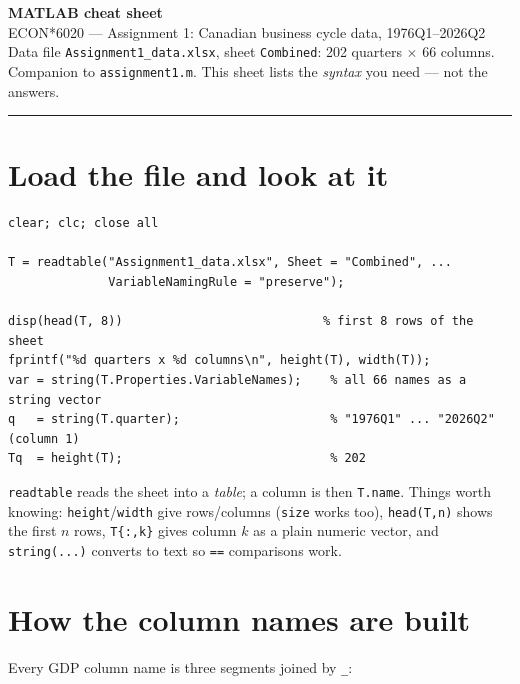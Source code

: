 \documentclass[11pt]{article}
\begin{document}
\begin{center}
{\LARGE\bfseries MATLAB cheat sheet}\\[2pt]
{\large ECON*6020 --- Assignment 1: Canadian business cycle data, 1976Q1--2026Q2}\\[4pt]
{\small Data file \texttt{Assignment1\_data.xlsx}, sheet \texttt{Combined}: 202 quarters $\times$ 66 columns.\\
Companion to \texttt{assignment1.m}. This sheet lists the \emph{syntax} you need --- not the answers.}
\end{center}

\vspace{2pt}
\hrule
\vspace{6pt}

\section{Load the file and look at it}

\begin{lstlisting}
clear; clc; close all

T = readtable("Assignment1_data.xlsx", Sheet = "Combined", ...
              VariableNamingRule = "preserve");

disp(head(T, 8))                            % first 8 rows of the sheet
fprintf("%d quarters x %d columns\n", height(T), width(T));
var = string(T.Properties.VariableNames);    % all 66 names as a string vector
q   = string(T.quarter);                     % "1976Q1" ... "2026Q2"  (column 1)
Tq  = height(T);                             % 202
\end{lstlisting}

\lstinline[style=inl]!readtable! reads the sheet into a \emph{table}; a column is then
\lstinline[style=inl]!T.name!. Things worth knowing: \lstinline[style=inl]!height!/\lstinline[style=inl]!width! give rows/columns
(\lstinline[style=inl]!size! works too), \lstinline[style=inl]!head(T,n)! shows the first $n$ rows, \lstinline[style=inl]!T{:,k}!
gives column $k$ as a plain numeric vector, and \lstinline[style=inl]!string(...)! converts to
text so \lstinline[style=inl]!==! comparisons work.

\section{How the column names are built}

Every GDP column name is three segments joined by \lstinline[style=inl]!_!:
\end{document}

